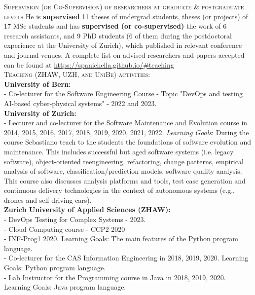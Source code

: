 \documentclass[11pt]{article}
\begin{document}
\medskip \medskip
\textsc{Supervision (or Co-Supervision) of researchers at graduate \& postgraduate levels}
\medskip
He is \textbf{supervised} 11 theses of undergrad students, theses (or projects) of 17 MSc students and has \textbf{supervised (or co-supervised)} the work of 6 research assistants, and 9 PhD students (6 of them during the postdoctoral experience at the University of Zurich), which published in relevant conference and journal venues. A complete list on advised researchers and papers accepted can be found at
\href{https://spanichella.github.io/\#teaching}{https://spanichella.github.io/\#teaching}
\medskip \\%
\textsc{Teaching (ZHAW, UZH, and UniBe) activities:}
\medskip \\
\textbf{University of Bern:}
\medskip \\
-   Co-lecturer for the Software Engineering Course - Topic "DevOps and testing AI-based cyber-physical systems" - 2022 and 2023.  
\medskip \\ 
\textbf{University of Zurich:} 
\medskip \\
-   Lecturer and co-lecturer for the Software Maintenance and Evolution course in 2014, 2015, 2016, 2017, 2018, 2019, 2020, 2021, 2022.   \textit{Learning Goals}: During the course Sebastiano teach to
the students the foundations of software evolution and maintenance. This includes successful but aged software systems (i.e. legacy software), object-oriented reengineering, refactoring, change patterns, empirical analysis of software, classification/prediction models, software quality analysis. This course also discusses analysis platforms and tools, test case generation and continuous delivery technologies in the context of autonomous systems (e.g., drones and self-driving cars).
\medskip \\
\textbf{Zurich University of Applied Sciences (ZHAW):}
\medskip \\
- DevOps Testing for Complex Systems - 2023. \\
- Cloud Computing course - CCP2 2020\\
- INF-Prog1 2020. Learning Goals: The main features of the Python program language.\\
- Co-lecturer for the CAS Information Engineering in 2018, 2019, 2020.
Learning Goals: Python program language.\\
- Lab Instructor for the Programming course in Java in 2018, 2019, 2020.
Learning Goals: Java program language.
\medskip 
\vspace{-5mm} 
\end{document}
